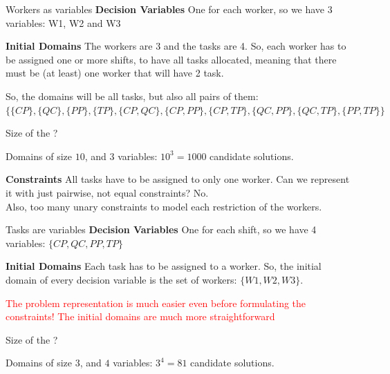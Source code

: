 \documentclass{cons-beamer}
\begin{document}
\begin{frame}{Workers as variables}
  \textbf{Decision Variables}
  One for each worker, so we have 3 variables: W1, W2 and W3
  \vfill

  \textbf{Initial Domains} The workers are 3 and the tasks are 4. So, each worker has to be assigned one or more shifts, to have all tasks allocated, meaning that there must be (at least) one worker that will have 2 task. 
  \vfill

  So, the domains will be all tasks, but also all pairs of them: 
  $\{\{CP\}, \{QC\}, \{PP\}, \{TP\}, \{CP, QC\}, \{CP, PP\}, \{CP, TP\}, \allowbreak \{QC, PP\}, \{QC, TP\}, \{PP, TP\}\}$
  \vfill

  Size of the ?
  

  Domains of size $10$, and $3$ variables: $10^3 = 1000$ candidate solutions.
  \vfill

  \textbf{Constraints} All tasks have to be assigned to only one worker. Can we represent it with just pairwise, not equal constraints?  \alert{No}. \\ \alert{Also, too many unary constraints to model each restriction of the workers.}
\end{frame}

\begin{frame}{Tasks are variables}
  \textbf{Decision Variables}
  One for each shift, so we have 4 variables: $\{CP, QC, PP, TP\}$
  \vfill

  \textbf{Initial Domains} Each task has to be assigned to a worker. So, the initial domain of every decision variable is the set of workers: $\{W1, W2, W3\}$.
  \vfill

  \textcolor{red}{The problem representation is much easier even before formulating the constraints! The initial domains are much more straightforward}
  \vfill

  Size of the ?
  

  Domains of size $3$, and $4$ variables: $3^4 = 81$ candidate solutions.
\end{frame}
\end{document}

